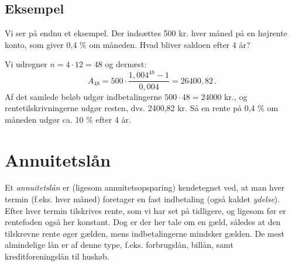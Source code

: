 \documentclass[12pt,oneside,a4paper]{article}
\begin{document}
\begin{tcolorbox}
\subsection{Eksempel}
Vi ser på endnu et eksempel. Der indsættes 500 kr. hver måned på en højrente konto, som giver
0,4 $\%$ om måneden. Hvad bliver saldoen efter 4 år?

Vi udregner $n=4\cdot12 = 48$ og dernæst:
\[
A_{48} = 500\cdot\frac{1,004^{48}-1}{0,004} = 26400,82 \,.
\]
Af det samlede beløb udgør indbetalingerne $500\cdot 48 = 24000$ kr., og rentetilskrivningerne
udgør resten, dvs. 2400,82 kr. Så en rente på 0,4 $\%$ om måneden udgør ca. 10 $\%$ efter 4 år.

\end{tcolorbox}

\section{Annuitetslån}
Et \emph{annuitetslån} er (ligesom annuitetsopsparing) kendetegnet ved, at man
hver termin (f.eks. hver måned) foretager en fast indbetaling (også kaldet
\emph{ydelse}). Efter hver termin tilskrives rente, som vi har set på
tidligere, og ligesom før er rentefoden også her konstant. Dog er der her tale
om en gæld, således at den tilskrevne rente øger gælden, mens indbetalingerne
mindsker gælden.  De mest almindelige lån er af denne type, f.eks. forbrugslån,
billån, samt kreditforeningslån til huskøb.
\end{document}
